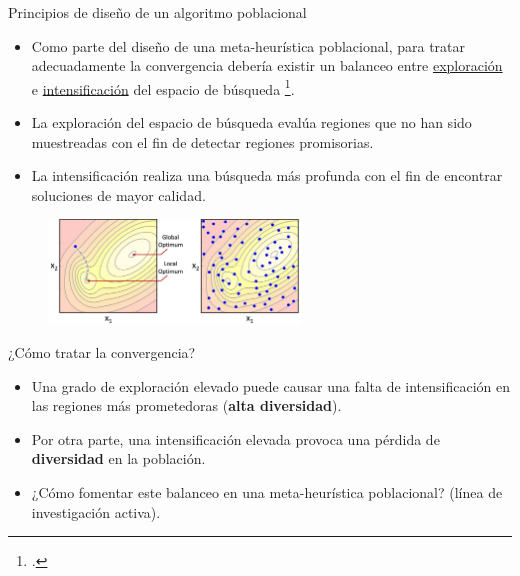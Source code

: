 \documentclass{beamer}
\begin{document}
\begin{frame}{Principios de diseño de un algoritmo poblacional}
\begin{itemize}
\justifying
    \item Como parte del diseño de una meta-heurística poblacional, para tratar adecuadamente la convergencia debería existir un balanceo entre \underline{exploración} e \underline{intensificación} del espacio de búsqueda \footcite{herrera1996adaptation}.
    \item La exploración del espacio de búsqueda evalúa regiones que no han sido muestreadas con el fin de detectar regiones promisorias.
    \item La intensificación realiza una búsqueda más profunda con el fin de encontrar soluciones de mayor calidad.
    
\end{itemize}
\begin{figure}
\includegraphics[width=0.6\textwidth]{exploration_2.png}
\label{fig:clasificacion}
\end{figure}

\end{frame}

\begin{frame}{¿Cómo tratar la convergencia?}
\begin{itemize}
\justifying
    \item Una grado de exploración elevado puede causar una falta de intensificación en las regiones más prometedoras (\textbf{alta diversidad}).
    \item Por otra parte, una intensificación elevada provoca una pérdida de \textbf{diversidad} en la población.
    \item ¿Cómo fomentar este balanceo en una meta-heurística poblacional? (línea de investigación activa).
\end{itemize}
\end{frame}
\end{document}

